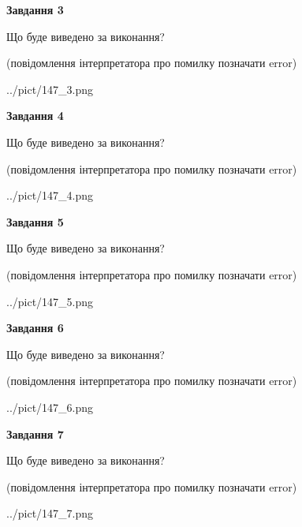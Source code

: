 \documentclass[12pt, ukrainian]{article}
\begin{document}
{\begin {large}
{\begin {center}\textbf{Завдання 3}\end {center}}\par
Що буде виведено за виконання?\par
 (повідомлення інтерпретатора про помилку позначати error)\par
\begin{center}
	{../pict/147_3.png}
\end{center}
\newpage

{\begin {center}\textbf{Завдання 4}\end {center}}\par
Що буде виведено за виконання?\par
 (повідомлення інтерпретатора про помилку позначати error)\par
\begin{center}
	{../pict/147_4.png}
\end{center}
\newpage

{\begin {center}\textbf{Завдання 5}\end {center}}\par
Що буде виведено за виконання?\par
 (повідомлення інтерпретатора про помилку позначати error)\par
\begin{center}
	{../pict/147_5.png}
\end{center}
\newpage

{\begin {center}\textbf{Завдання 6}\end {center}}\par
Що буде виведено за виконання?\par
 (повідомлення інтерпретатора про помилку позначати error)\par
\begin{center}
	{../pict/147_6.png}
\end{center}
\newpage

{\begin {center}\textbf{Завдання 7}\end {center}}\par
Що буде виведено за виконання?\par
 (повідомлення інтерпретатора про помилку позначати error)\par
\begin{center}
	{../pict/147_7.png}
\end{center}
\newpage


\end{large}}
\end{document}
